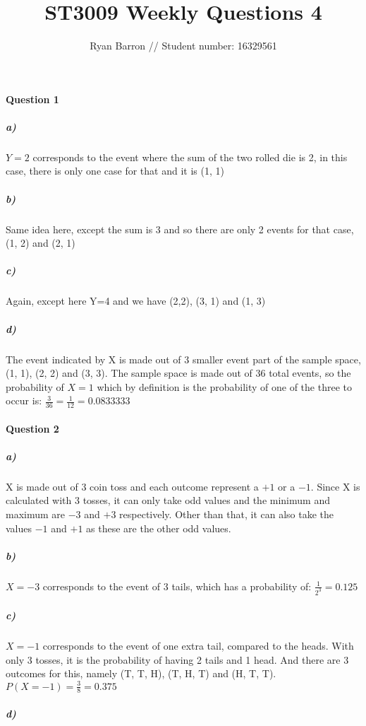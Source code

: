 \documentclass{article}
\title{ST3009 Weekly Questions 4}
\author{Ryan Barron // Student number: 16329561}
\date{}
\begin{document}
\maketitle

\paragraph{Question 1}
\subparagraph{a)}
$Y=2$ corresponds to the event where the sum of the two rolled die is 2, in this case, there is only one case for that and it is (1, 1)
\subparagraph{b)}
Same idea here, except the sum is 3 and so there are only 2 events for that case, (1, 2) and (2, 1)
\subparagraph{c)}
Again, except here Y=4 and we have (2,2), (3, 1) and (1, 3)
\subparagraph{d)}
The event indicated by X is made out of 3 smaller event part of the sample space, (1, 1), (2, 2) and (3, 3). The sample space is made out of 36 total events, so the probability of $X=1$ which by definition is the probability of one of the three to occur is: $\frac{3}{36} = \frac{1}{12} = 0.0833333$

\paragraph{Question 2}
\subparagraph{a)}
X is made out of 3 coin toss and each outcome represent a $+1$ or a $-1$. Since X is calculated with 3 tosses, it can only take odd values and the minimum and maximum are $-3$ and $+3$ respectively. Other than that, it can also take the values $-1$ and $+1$ as these are the other odd values.
\subparagraph{b)}
$X=-3$ corresponds to the event of 3 tails, which has a probability of: $\frac{1}{2^3} = 0.125$
\subparagraph{c)}
$X=-1$ corresponds to the event of one extra tail, compared to the heads. With only 3 tosses, it is the probability of having 2 tails and 1 head. And there are 3 outcomes for this, namely (T, T, H), (T, H, T) and (H, T, T).
$P(X=-1) = \frac{3}{8} = 0.375$
\subparagraph{d)}
\end{document}
